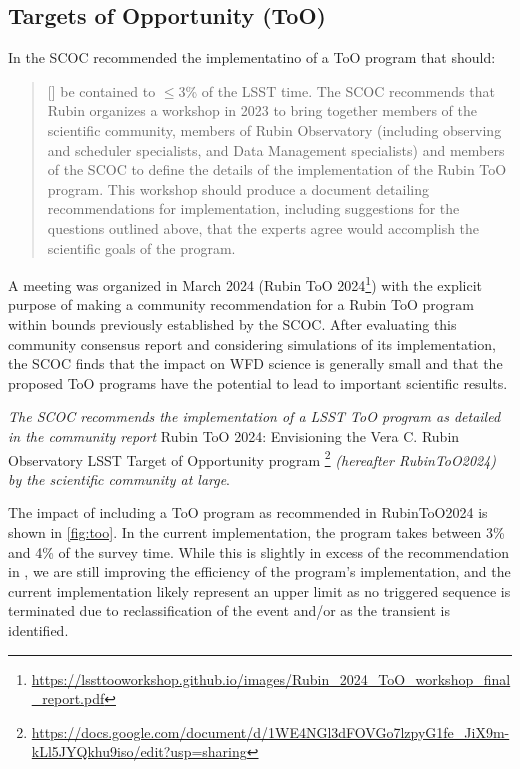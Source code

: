 \FloatBarrier





\subsection{Targets of Opportunity (ToO)}\label{sec:ToO}
 
In  the SCOC recommended the implementatino of a ToO program that should:

\begin{quote}
    
[] be contained to $\leq$3\% of the LSST time. The SCOC recommends that Rubin organizes a workshop in 2023 to bring together members of the scientific community, members of Rubin Observatory (including observing and scheduler specialists, and Data Management specialists) and members of the SCOC to define the details of the implementation of the Rubin ToO program. This workshop should produce a document detailing recommendations for implementation, including suggestions for the questions outlined above, that the experts agree would accomplish the scientific goals of the program.
\end{quote}

A meeting was organized in March 2024 (Rubin ToO 2024\footnote{\url{https://lssttooworkshop.github.io/images/Rubin_2024_ToO_workshop_final_report.pdf}}) with the explicit purpose of making a community recommendation for a Rubin ToO program within bounds previously established by the SCOC. After evaluating this community consensus report and considering simulations of its implementation, the SCOC finds that the impact on WFD science is generally small and that the proposed ToO programs have the potential to lead to important scientific results. 

 {\it The SCOC recommends the implementation of a LSST ToO program as detailed in the community report} Rubin ToO 2024: 
Envisioning the Vera C. Rubin Observatory LSST Target of Opportunity program
\footnote{\url{https://docs.google.com/document/d/1WE4NGl3dFOVGo7lzpyG1fe_JiX9m-kLl5JYQkhu9iso/edit?usp=sharing}} \emph{(hereafter RubinToO2024) by the scientific community at large}. 

The impact of including a ToO program as recommended in RubinToO2024 is shown in \autoref{fig:too}. In the current implementation, the program takes between 3\% and 4\% of the survey time. While this is slightly in excess of the recommendation in , we are still improving the efficiency of the program's implementation, and the current implementation likely represent an upper limit as no triggered sequence is terminated due to reclassification of the event and/or as the transient is identified.

